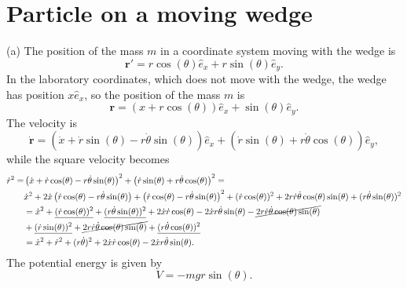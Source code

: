 \documentclass{article}
\begin{document}
    \section{Particle on a moving wedge}    
        (a) The position of the mass $m$ in a coordinate system moving with the wedge is
        \begin{equation*}
            \mathbf{r}' = r \cos(\theta) \hat e_x + r \sin(\theta) \hat e_y.
        \end{equation*}
        In the laboratory coordinates, which does not move with the wedge, the wedge has position $x \hat e_x$, so the position of the mass $m$ is 
        \begin{equation*}
            \mathbf{r} = (x + r \cos(\theta)) \hat e_x + \sin(\theta) \hat e_y.
        \end{equation*}
        The velocity is
        \begin{equation*}
            \mathbf{\dot r}
            = (\dot x  + \dot r \sin(\theta) - r \dot \theta \sin(\theta)) \hat e_x
            + (\dot r \sin(\theta) + r \dot \theta \cos(\theta)) \hat e_y,
        \end{equation*}
        while the square velocity becomes
        \begin{align*}
            \dot r^2 = & \left(\dot x  + \dot r \cos(\theta) - r \dot \theta \sin(\theta)\right)^2 + \left(\dot r \sin(\theta) + r \dot \theta \cos(\theta)\right)^2 = \\
            & \dot x^2 + 2 \dot x \left(\dot r \cos(\theta) - r \dot \theta \sin(\theta)\right) + \left(\dot r \cos(\theta) - r \dot \theta \sin(\theta)\right)^2 
            + (\dot r \cos(\theta))^2 + 2r \dot r \dot \theta \cos(\theta) \sin(\theta) + (r \dot \theta \sin(\theta))^2\\
            & = \dot x^2 + \underline{(\dot r\cos(\theta))^2} + \underline{(r \dot \theta \sin(\theta))^2} + 2 \dot x \dot r \cos(\theta) - 2 \dot x r \dot \theta \sin(\theta) - \cancel{2 r \dot r \dot \theta \cos(\theta) \sin(\theta)} \\
            & + \underline{(\dot r \sin(\theta))^2} + \cancel{2r \dot r \dot \theta \cos(\theta) \sin(\theta)} + \underline{(r \dot \theta \cos(\theta))^2}\\
            & = \dot x^2 + \dot r^2 + (r \dot \theta)^2+ 2 \dot x \dot r \cos(\theta) - 2 \dot x r \dot \theta \sin(\theta). 
        \end{align*}
        The potential energy is given by
        \begin{equation*}
            V = -m g r \sin(\theta).
        \end{equation*}
\end{document}
